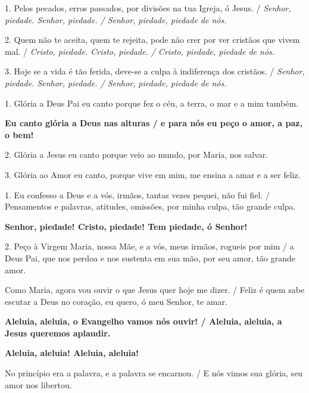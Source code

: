 \documentclass[a5paper,9pt]{extarticle}
\begin{document}
\begin{cantos}
\begin{canto}
1. Pelos pecados, erros passados, por divisões na tua Igreja, ó Jesus. / \emph{Senhor, piedade. Senhor, piedade. / Senhor, piedade, piedade de nós. }

2. Quem não te aceita, quem te rejeita, pode não crer por ver cristãos que vivem mal. / \emph{Cristo, piedade. Cristo, piedade. / Cristo, piedade, piedade de nós. }

3. Hoje se a vida é tão ferida, deve-se a culpa à indiferença dos cristãos. / \emph{Senhor, piedade. Senhor, piedade. / Senhor, piedade, piedade de nós. }
\end{canto}

\begin{canto}
1. Glória a Deus Pai eu canto porque fez o céu, a terra, o mar e a mim também.

\textbf{Eu canto glória a Deus nas alturas / e para nós eu peço o amor, a paz, o bem!}

2. Glória a Jesus eu canto porque veio ao mundo, por Maria, nos salvar.

3. Glória ao Amor eu canto, porque vive em mim, me ensina a amar e a ser feliz.
\end{canto}


\begin{canto}
1. Eu confesso a Deus e a vós, irmãos, tantas vezes pequei, não fui fiel. / Pensamentos e palavras, atitudes, omissões, por minha culpa, tão grande culpa.

\textbf{Senhor, piedade! Cristo, piedade! Tem piedade, ó Senhor! }

2. Peço à Virgem Maria, nossa Mãe, e a vós, meus irmãos, rogueis por mim / a Deus Pai, que nos perdoa e nos sustenta em sua mão, por seu amor, tão grande amor.
\end{canto}

\begin{canto}
Como Maria, agora vou ouvir o que Jesus quer hoje me dizer. / Feliz é quem sabe escutar a Deus no coração, eu quero, ó meu Senhor, te amar.

\textbf{Aleluia, aleluia, o Evangelho vamos nós ouvir! / Aleluia, aleluia, a Jesus queremos aplaudir.}
\end{canto}

\begin{canto}
\textbf{Aleluia, aleluia! Aleluia, aleluia!}

No princípio era a palavra, e a palavra se encarnou. / E nós vimos sua glória, seu amor nos libertou.
\end{canto}


\end{cantos}
\end{document}
